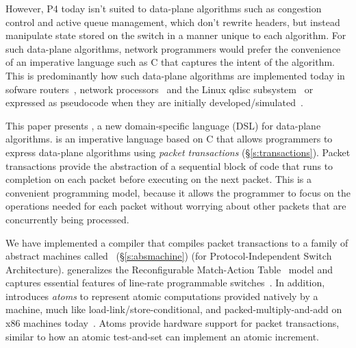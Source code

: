 However, P4 today isn't suited to data-plane algorithms such as congestion
control and active queue management, which don't rewrite headers, but instead
manipulate state stored on the switch in a manner unique to each algorithm.
For such data-plane algorithms, network programmers would prefer the
convenience of an imperative language such as C that captures the intent of the
algorithm. This is predominantly how such data-plane algorithms are implemented
today in sofware routers~\cite{click, dpdk, routebricks}, network
processors~\cite{packetc, nova} and the Linux qdisc subsystem~\cite{qdisc} or
expressed as pseudocode when they are initially developed/simulated~\cite{red,
csfq, codel_code, avq, blue}.

This paper presents \pktlanguage, a new domain-specific language (DSL) for
data-plane algorithms.  \pktlanguage is an imperative language based on C that
allows programmers to express data-plane algorithms using {\em packet
transactions} (\S\ref{s:transactions}).  Packet transactions provide the
abstraction of a sequential block of code that runs to completion on each
packet before executing on the next packet. This is a convenient programming
model, because it allows the programmer to focus on the operations needed for
each packet without worrying about other packets that are concurrently being
processed.

We have implemented a \pktlanguage compiler that compiles packet transactions
to a family of abstract machines called \absmachine~(\S\ref{s:absmachine}) (for
Protocol-Independent Switch Architecture). \absmachine generalizes the
Reconfigurable Match-Action Table~\cite{rmt} model and captures essential
features of line-rate programmable switches~\cite{rmt, xpliant, flexpipe}. In
addition, \absmachine introduces {\em atoms} to represent atomic computations
provided natively by a \absmachine machine, much like
load-link/store-conditional, and packed-multiply-and-add on x86 machines
today~\cite{x86_manual}.  Atoms provide hardware support for packet
transactions, similar to how an atomic test-and-set can implement an atomic
increment.

